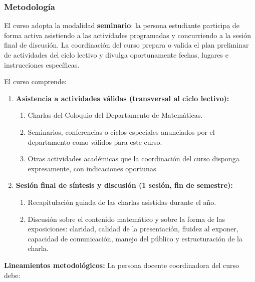 \begin{refsection}
\subsubsection*{Metodología}

El curso adopta la modalidad \textbf{seminario}: la persona estudiante participa de forma activa asistiendo a las actividades programadas y concurriendo a la sesión final de discusión. La coordinación del curso prepara o valida el plan preliminar de actividades del ciclo lectivo y divulga oportunamente fechas, lugares e instrucciones específicas.

El curso comprende:

\begin{enumerate}
\item \textbf{Asistencia a actividades válidas (transversal al ciclo lectivo):}
\begin{enumerate}
    \item Charlas del Coloquio del Departamento de Matemáticas.
    \item Seminarios, conferencias o ciclos especiales anunciados por el departamento como válidos para este curso.
    \item Otras actividades académicas que la coordinación del curso disponga expresamente, con indicaciones oportunas.
\end{enumerate}

\item \textbf{Sesión final de síntesis y discusión (1 sesión, fin de semestre):}
\begin{enumerate}
    \item Recapitulación guiada de las charlas asistidas durante el año.
    \item Discusión sobre el contenido matemático y sobre la forma de las exposiciones: claridad, calidad de la presentación, fluidez al exponer, capacidad de comunicación, manejo del público y estructuración de la charla.
\end{enumerate}
\end{enumerate}

\noindent\textbf{Lineamientos metodológicos:} La persona docente coordinadora del curso debe:


\end{refsection}
